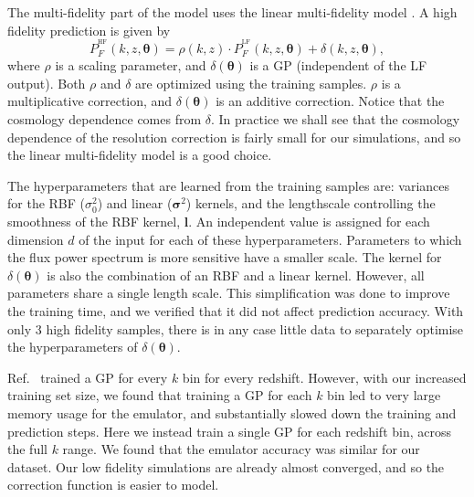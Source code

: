 \documentclass[a4paper,11pt]{article}
\begin{document}
The multi-fidelity part of the model uses the linear multi-fidelity model \citep{10.1093/biomet/87.1.1}. A high fidelity prediction is given by
\begin{equation}
    P_F^{^\mathrm{HF}}(k, z, \boldsymbol{\theta}) = \rho(k, z) \cdot P_F^{^\mathrm{LF}}(k, z, \boldsymbol{\theta}) + \delta(k, z, \boldsymbol{\theta}),
    \label{eq:ko_model}
\end{equation}
where $\rho$ is a scaling parameter, and $\delta(\boldsymbol{\theta})$ is a GP (independent of the LF output). Both $\rho$ and $\delta$ are optimized using the training samples. $\rho$ is a multiplicative correction, and $\delta(\boldsymbol{\theta})$ is an additive correction. Notice that the cosmology dependence comes from $\delta$. In practice we shall see that the cosmology dependence of the resolution correction is fairly small for our simulations, and so the linear multi-fidelity model is a good choice.

The hyperparameters that are learned from the training samples are: variances for the RBF ($\sigma_0^2$) and  linear ($\boldsymbol{\sigma}^2$) kernels, and the lengthscale controlling the smoothness of the RBF kernel, $\boldsymbol{l}$. An independent value is assigned for each dimension $d$ of the input for each of these hyperparameters. Parameters to which the flux power spectrum is more sensitive have a smaller scale. The kernel for $\delta(\boldsymbol{\theta})$ is also the combination of an RBF and a linear kernel. However, all parameters share a single length scale. This simplification was done to improve the training time, and we verified that it did not affect prediction accuracy. With only $3$ high fidelity samples, there is in any case little data to separately optimise the hyperparameters of $\delta(\boldsymbol{\theta})$.

Ref.~\cite{Fernandez:2022} trained a GP for every $k$ bin for every redshift. However, with our increased training set size, we found that training a GP for each $k$ bin led to very large memory usage for the emulator, and substantially slowed down the training and prediction steps. Here we instead train a single GP for each redshift bin, across the full $k$ range. We found that the emulator accuracy was similar for our dataset. Our low fidelity simulations are already almost converged, and so the correction function is easier to model.

\end{document}
